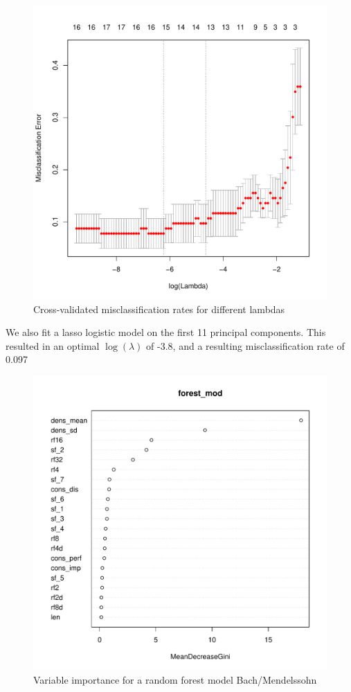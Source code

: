 \documentclass[12pt,twoside]{reedthesis}
\theoremstyle{definition}
\theoremstyle{definition}
\theoremstyle{definition}
\theoremstyle{remark}
\begin{document}
\begin{figure}[h]
\centering
\includegraphics[scale = .5]{images/loglambda_b.pdf}
\caption{Cross-validated misclassification rates for different lambdas}
\label{subd}
\end{figure}
We also fit a lasso logistic model on the first 11 principal components.
This resulted in an optimal \(\log(\lambda)\) of -3.8, and a resulting
misclassification rate of 0.097
\begin{figure}[h]
\centering
\includegraphics[scale = .5]{images/varImp_b.pdf}
\caption{Variable importance for a random forest model Bach/Mendelssohn}
\label{subd}
\end{figure}
\end{document}
